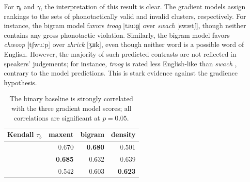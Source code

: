 For $\tau_b$ and $\gamma$, the interpretation of this result is clear. The gradient models assign rankings to the sets of phonotactically valid and invalid clusters, respectively. For instance, the bigram model favors \emph{troog} [tɹuːɡ] over \emph{swach} [swætʃ], though neither contains any gross phonotactic violation. Similarly, the bigram model favors \emph{chwoop} [tʃwuːp] over \emph{zhrick} [ʒɹɪk], even though neither word is a possible word of English. However, the majority of such predicted contrasts are not reflected in speakers' judgements; for instance, \emph{troog} is rated less English-like than \emph{swach} \citep{Greenberg1964}, contrary to the model predictions. This is stark evidence against the gradience hypothesis.

\begin{table} \centering
\begin{tabular}{l r r r}
\toprule
Kendall $\tau_b$          & maxent         & bigram         & density  \\
\midrule
\citealt{Greenberg1964}   & 0.670          & \textbf{0.680} & 0.501 \\
\citealt{Scholes1966}     & \textbf{0.685} & 0.632          & 0.639 \\
\citealt{Albright2003b}   & 0.542          & 0.603          & \textbf{0.623} \\
\bottomrule
\end{tabular}
\caption{The binary baseline is strongly correlated with the three gradient model scores; all correlations are significant at $p = 0.05$.}
\label{bcor}
\end{table}

